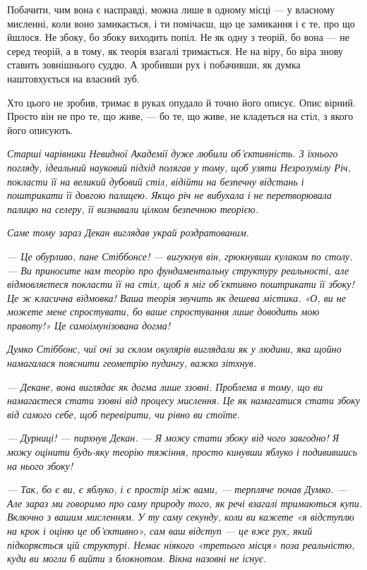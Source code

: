 \documentclass[12pt, a4paper, openany]{book}
\begin{document}
Побачити, чим вона є насправді, можна лише в одному місці --- у власному мисленні, коли воно замикається, і ти помічаєш, що це замикання і є те, про що йшлося. Не збоку, бо збоку виходить попіл. Не як одну з теорій, бо вона --- не серед теорій, а в тому, як теорія взагалі тримається. Не на віру, бо віра знову ставить зовнішнього суддю. А зробивши рух і побачивши, як думка наштовхується на власний зуб.

Хто цього не зробив, тримає в руках опудало й точно його описує. Опис вірний. Просто він не про те, що живе, --- бо те, що живе, не кладеться на стіл, з якого його описують.

\begin{terrybox}
\textit{Старші чарівники Невидної Академії дуже любили об'єктивність. З їхнього погляду, ідеальний науковий підхід полягав у тому, щоб узяти Незрозумілу Річ, покласти її на великий дубовий стіл, відійти на безпечну відстань і поштрикати її довгою палицею. Якщо річ не вибухала і не перетворювала палицю на селеру, її визнавали цілком безпечною теорією.}

\textit{Саме тому зараз Декан виглядав украй роздратованим.}

\textit{--- Це обурливо, пане Стіббонсе! --- вигукнув він, грюкнувши кулаком по столу. --- Ви приносите нам теорію про фундаментальну структуру реальності, але відмовляєтеся покласти її на стіл, щоб я міг об'єктивно поштрикати її збоку! Це ж класична відмовка! Ваша теорія звучить як дешева містика. «О, ви не можете мене спростувати, бо ваше спростування лише доводить мою правоту!» Це самоімунізована догма!}

\textit{Думко Стіббонс, чиї очі за склом окулярів виглядали як у людини, яка щойно намагалася пояснити геометрію пудингу, важко зітхнув.}

\textit{--- Декане, вона виглядає як догма лише ззовні. Проблема в тому, що ви намагаєтеся стати ззовні від процесу мислення. Це як намагатися стати збоку від самого себе, щоб перевірити, чи рівно ви стоїте.}

\textit{--- Дурниці! --- пирхнув Декан. --- Я можу стати збоку від чого завгодно! Я можу оцінити будь-яку теорію тяжіння, просто кинувши яблуко і подивившись на нього збоку!}

\textit{--- Так, бо є ви, є яблуко, і є простір між вами, --- терпляче почав Думко. --- Але зараз ми говоримо про саму природу того, як речі взагалі тримаються купи. Включно з вашим мисленням. У ту саму секунду, коли ви кажете «я відступлю на крок і оціню це об'єктивно», сам ваш відступ --- це вже рух, який підкоряється цій структурі. Немає ніякого «третього місця» поза реальністю, куди ви могли б вийти з блокнотом. Вікна назовні не існує.}


\end{terrybox}
\end{document}
